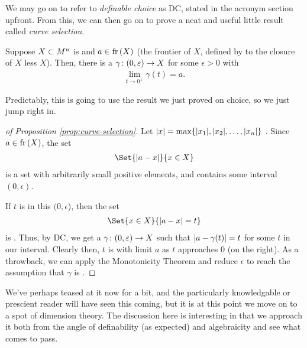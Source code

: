 We may go on to refer to \emph{definable choice} as DC, stated in the acronym section upfront. From this, we can then go on to prove a neat and useful little result called \emph{curve selection}.

\begin{proposition}
  \label{prop:curve-selection}
  Suppose $X \subset M^{n}$ is  and $a \in \operatorname{fr}\left(X\right)$ (the frontier of $X$, defined by to the closure of $X$ less $X$). Then, there is a \cont {} \inj $\gamma \colon (0, \varepsilon) \to X$ for some $\epsilon > 0$ with
  \begin{align*}
    \lim_{t \to 0^{+}} \gamma (t) = a.
  \end{align*}
\end{proposition}

Predictably, this is going to use the result we just proved on  choice, so we just jump right in.

\begin{proof}[of Proposition \ref{prop:curve-selection}]
 Let $\vert x\vert = \max \{ \vert x_1\vert, \vert x_2\vert, \hdots, \vert x_n\vert \}$ . Since $a \in \operatorname{fr}\left(X\right)$, the set 
   \begin{align*}
     \Set{\abs{a - x}}{x \in X}
   \end{align*}
   is a  set with arbitrarily small positive elements, and contains some interval $(0, \epsilon)$.
   
   If $t$ is in this $(0, \epsilon$), then the set 
   \begin{align*}
     \Set{x \in X}{\abs{a - x} = t}
   \end{align*}
  is \inhb. Thus, by DC, we get a  $\gamma \colon (0, \varepsilon) \to X$ such that $\vert a - \gamma(t)\vert = t$ for some $t$ in our interval. Clearly then, $t$ is \inj with limit $a$ as $t$ approaches 0 (on the right). As a throwback, we can apply the Monotonicity Theorem and reduce $\epsilon$ to reach the assumption that $\gamma$ is \cont.
\end{proof}

We've perhaps teased at it now for a bit, and the particularly knowledgable or prescient reader will have seen this coming, but it is at this point we move on to a spot of dimension theory. The discussion here is interesting in that we approach it both from the angle of definability (as expected) and algebraicity and see what comes to pass.
